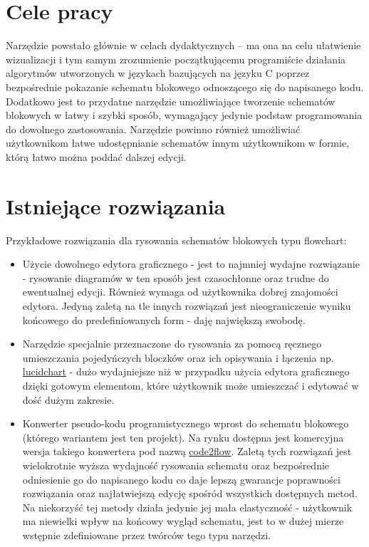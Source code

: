 \section{Cele pracy}
	Narzędzie powstało głównie w celach dydaktycznych -- ma ona na celu ułatwienie wizualizacji i tym samym zrozumienie początkującemu programiście działania algorytmów utworzonych w językach bazujących na języku C poprzez bezpośrednie pokazanie schematu blokowego odnoszącego się do napisanego kodu. Dodatkowo jest to przydatne narzędzie umożliwiające tworzenie schematów blokowych w łatwy i szybki sposób, wymagający jedynie podstaw programowania do dowolnego zastosowania. Narzędzie powinno również umożliwiać użytkownikom łatwe udostępnianie schematów innym użytkownikom w formie, którą łatwo można poddać dalszej edycji.
	
\section{Istniejące rozwiązania}
	Przykładowe rozwiązania dla rysowania schematów blokowych typu flowchart:
	\begin{itemize}
		\item Użycie dowolnego edytora graficznego - jest to najmniej wydajne rozwiązanie - rysowanie diagramów w ten sposób jest czasochłonne oraz trudne do ewentualnej edycji. Również wymaga od użytkownika dobrej znajomości edytora. Jedyną zaletą na tle innych rozwiązań jest nieograniczenie wyniku końcowego do predefiniowanych form - daję największą swobodę.
		
		\item Narzędzie specjalnie przeznaczone do rysowania za pomocą ręcznego umieszczania pojedyńczych bloczków oraz ich opisywania i łączenia np. \href{https://www.lucidchart.com/pages/examples/flowchart_software}{lucidchart} - dużo wydajniejsze niż w przypadku użycia edytora graficznego dzięki gotowym elementom, które użytkownik może umieszczać i edytować w dość dużym zakresie.
		
		\item Konwerter pseudo-kodu programistycznego wprost do schematu blokowego (którego wariantem jest ten projekt). Na rynku dostępna jest komercyjna wersja takiego konwertera pod nazwą \href{https://code2flow.com}{code2flow}. Zaletą tych rozwiązań jest wielokrotnie wyższa wydajność rysowania schematu oraz bezpośrednie odniesienie go do napisanego kodu co daje lepszą gwarancje poprawności rozwiązania oraz najłatwiejszą edycję spośród wszystkich dostępnych metod. Na niekorzyść tej metody działa jedynie jej mała elastyczność - użytkownik ma niewielki wpływ na końcowy wygląd schematu, jest to w dużej mierze wstępnie zdefiniowane przez twórców tego typu narzędzi.
	\end{itemize}

